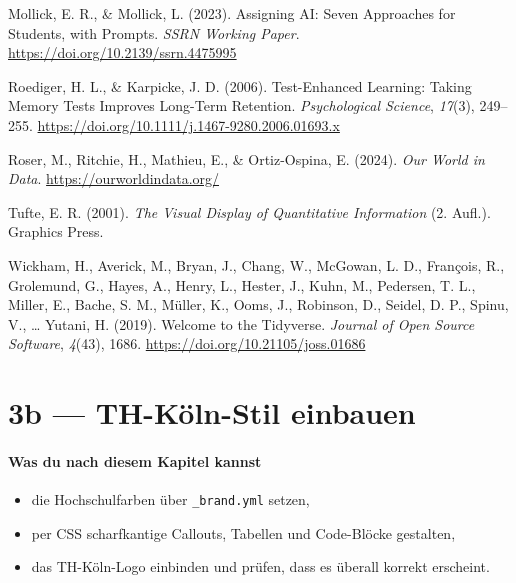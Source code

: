 \documentclass[
  ngerman,
  a4paper,
  DIV=11]{scrreprt}
\newlength{\cslhangindent}
\newenvironment{CSLReferences}[2] %
 {\begin{list}{}{%
  \setlength{\itemindent}{0pt}
  \setlength{\leftmargin}{0pt}
  \setlength{\parsep}{0pt}
  \ifodd #1
   \setlength{\leftmargin}{\cslhangindent}
   \setlength{\itemindent}{-1\cslhangindent}
  \fi
  \setlength{\itemsep}{#2\baselineskip}}}
 {\end{list}}
\providecommand{\tightlist}{%
  \setlength{\itemsep}{0pt}\setlength{\parskip}{0pt}}
\begin{document}
\begin{CSLReferences}{1}{0}
Mollick, E. R., \& Mollick, L. (2023). Assigning {AI}: Seven Approaches
for Students, with Prompts. \emph{SSRN Working Paper}.
\url{https://doi.org/10.2139/ssrn.4475995}

Roediger, H. L., \& Karpicke, J. D. (2006). Test-Enhanced Learning:
Taking Memory Tests Improves Long-Term Retention. \emph{Psychological
Science}, \emph{17}(3), 249--255.
\url{https://doi.org/10.1111/j.1467-9280.2006.01693.x}

Roser, M., Ritchie, H., Mathieu, E., \& Ortiz-Ospina, E. (2024).
\emph{Our World in Data}. \url{https://ourworldindata.org/}

Tufte, E. R. (2001). \emph{The Visual Display of Quantitative
Information} (2. Aufl.). Graphics Press.

Wickham, H., Averick, M., Bryan, J., Chang, W., McGowan, L. D.,
François, R., Grolemund, G., Hayes, A., Henry, L., Hester, J., Kuhn, M.,
Pedersen, T. L., Miller, E., Bache, S. M., Müller, K., Ooms, J.,
Robinson, D., Seidel, D. P., Spinu, V., \ldots{} Yutani, H. (2019).
Welcome to the Tidyverse. \emph{Journal of Open Source Software},
\emph{4}(43), 1686. \url{https://doi.org/10.21105/joss.01686}

\end{CSLReferences}

\chapter{3b --- TH-Köln-Stil einbauen}\label{b-th-kuxf6ln-stil-einbauen}

\subsubsection{Was du nach diesem Kapitel
kannst}\label{was-du-nach-diesem-kapitel-kannst-3}

\begin{itemize}
\tightlist
\item
  die Hochschulfarben über \texttt{\_brand.yml} setzen,
\item
  per CSS scharfkantige Callouts, Tabellen und Code-Blöcke gestalten,
\item
  das TH-Köln-Logo einbinden und prüfen, dass es überall korrekt
  erscheint.
\end{itemize}
\end{document}
